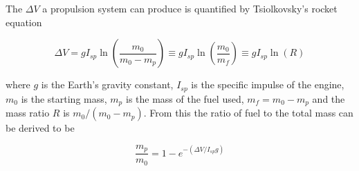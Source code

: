 The $\Delta V$ a propulsion system can produce is quantified by Tsiolkovsky's rocket equation

\begin{equation}
\Delta V = g I_{sp} \ln{\left(\frac{m_0}{m_0-m_p}\right)}\equiv g I_{sp} \ln{\left(\frac{m_0}{m_f}\right)} \equiv g I_{sp} \ln{\left(R\right)}
\label{eqn:tsiolkovsky}
\end{equation}

where $g$ is the Earth's gravity constant, $I_{sp}$ is the specific impulse of the engine, $m_0$ is the starting mass, $m_p$ is the mass of the fuel used, $m_f = m_0-m_p$ and the mass ratio $R$ is  ${m_0}/\left({m_0-m_p}\right)$. From this the ratio of fuel to the total mass can be derived to be

\begin{equation}
\frac{m_p}{m_0} = 1-e^{-\left(\Delta V/I_{sp}g\right)}
\label{eqn:fuelratio}
\end{equation} 